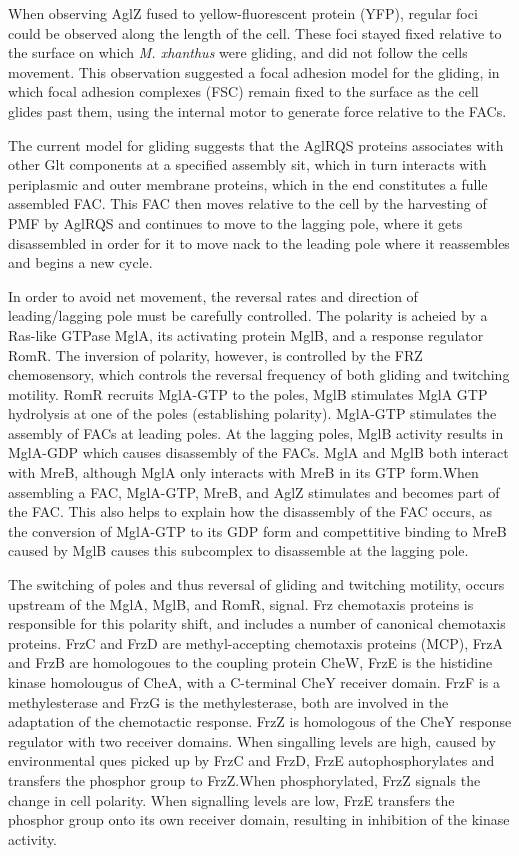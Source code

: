 \documentclass[fleqn,10pt]{wlscirep}
\begin{document}
When observing AglZ fused to yellow-fluorescent protein (YFP), regular foci could be observed along the length of the cell. These foci stayed fixed relative to the surface on which \textit{M. xhanthus} were gliding, and did not follow the cells movement. This observation suggested a focal adhesion model for the gliding, in which focal adhesion complexes (FSC) remain fixed to the surface as the cell glides past them, using the internal motor to generate force relative to the FACs.

The current model for gliding suggests that the AglRQS proteins associates with other Glt components at a specified assembly sit, which in turn interacts with periplasmic and outer membrane proteins, which in the end constitutes a fulle assembled FAC. This FAC then moves relative to the cell by the harvesting of PMF by AglRQS and continues to move to the lagging pole, where it gets disassembled in order for it to move nack to the leading pole where it reassembles and begins a new cycle.


In order to avoid net movement, the reversal rates and direction of leading/lagging pole must be carefully controlled. The polarity is acheied by a Ras-like GTPase MglA, its activating protein MglB, and a response regulator RomR. The inversion of polarity, however, is controlled by the FRZ chemosensory, which controls the reversal frequency of both gliding and twitching motility. RomR recruits MglA-GTP to the poles, MglB stimulates MglA GTP hydrolysis at one of the poles (establishing polarity). MglA-GTP stimulates the assembly of FACs at leading poles. At the lagging poles, MglB activity results in MglA-GDP which causes disassembly of the FACs. MglA and MglB both interact with MreB, although MglA only interacts with MreB in its GTP form.When assembling a FAC, MglA-GTP, MreB, and AglZ stimulates and becomes part of the FAC. This also helps to explain how the disassembly of the FAC occurs, as the conversion of MglA-GTP to its GDP form and compettitive binding to MreB caused by MglB causes this subcomplex to disassemble at the lagging pole.

The switching of poles and thus reversal of gliding and twitching motility, occurs upstream of the MglA, MglB, and RomR, signal. Frz chemotaxis proteins is responsible for this polarity shift, and includes a number of canonical chemotaxis proteins. FrzC and FrzD are methyl-accepting chemotaxis proteins (MCP), FrzA and FrzB are homologoues to the coupling protein CheW, FrzE is the histidine kinase homolougus of CheA, with a C-terminal CheY receiver domain. FrzF is a methylesterase and FrzG is the methylesterase, both are involved in the adaptation of the chemotactic response. FrzZ is homologous of the CheY response regulator with two receiver domains. When singalling levels are high, caused by environmental ques picked up by FrzC and FrzD, FrzE autophosphorylates and transfers the phosphor group to FrzZ.When phosphorylated, FrzZ signals the change in cell polarity. When signalling levels are low, FrzE transfers the phosphor group onto its own receiver domain, resulting in inhibition of the kinase activity.    
\end{document}
